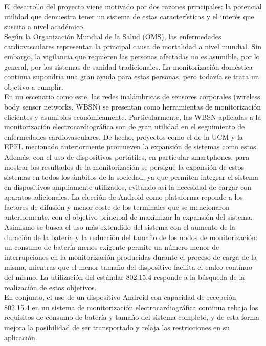 	El desarrollo del proyecto viene motivado por dos razones principales: la 
	potencial utilidad que demuestra tener un sistema de estas características 
	y el interés que suscita a nivel académico.\\

	Según la Organización Mundial de la Salud (OMS), las enfermedades cardiovasculares representan la
	principal causa de mortalidad a nivel mundial. Sin embargo, la vigilancia que requieren las
	personas afectadas no es asumible, por lo general, por los sistemas de sanidad tradicionales. La
	monitorización doméstica continua supondría una gran ayuda para estas personas, pero todavía
	se trata un objetivo a cumplir.\\

	En un escenario como este, las redes inalámbricas de sensores corporales (wireless body sensor
	networks, WBSN) se presentan como herramientas de monitorización eficientes y asumibles
	económicamente. Particularmente, las WBSN aplicadas a la monitorización electrocardiográfica son
	de gran utilidad en el seguimiento de enfermedades cardiovasculares. De hecho, proyectos como el
	de la UCM y la EPFL mecionado anteriormente promueven la expansión de sistemas como estos.\\

	Además, con el uso de dispositivos portátiles, en particular smartphones, para mostrar los
	resultados de la monitorización se persigue la expansión de estos sistemas en todos los ámbitos
	de la sociedad, ya que permiten integrar el sistema en dispositivos ampliamente utilizados, 
	evitando así la necesidad de cargar con aparatos adicionales. La elección de Android como 
	plataforma reponde a	los factores de difusión y menor coste de los terminales que se mencionaron 
	anteriormente, con el objetivo principal 	de maximizar la expansión del sistema.\\

	Asimismo se busca el uso más extendido del sistema con el aumento de la duración de la
	batería y la reducción del tamaño de los nodos de monitorización: un consumo de batería menos
	exigente permite un número menor de interrupciones en la monitorización producidas durante el
	proceso de carga de la misma, mientras que el menor tamaño del dispositivo facilita el emleo
	contínuo del mismo. La utilización del estándar 802.15.4 responde a la búsqueda de la
	realización de estos objetivos.\\

	En conjunto, el uso de un dispositivo Android con capacidad de recepción 802.15.4 en un
	sistema de monitorización electrocardiográfica continua rebaja los requisitos de consumo de batería
	y tamaño del sistema completo, y de esta forma mejora la posibilidad de ser transportado y relaja
	las restricciones en su aplicación.\\

